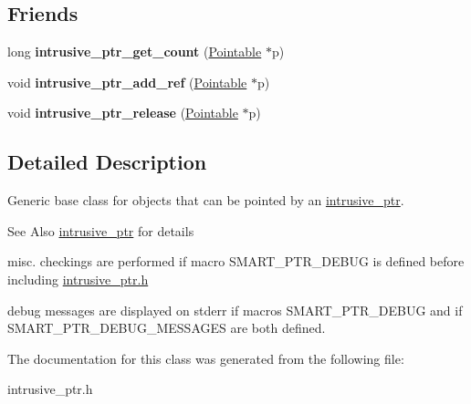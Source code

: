 \subsection*{Friends}
\begin{DoxyCompactItemize}
\item 
\hypertarget{classPointable_a9c08ce04af1d8cd2697b64990c51a5f4}{long {\bfseries intrusive\-\_\-ptr\-\_\-get\-\_\-count} (\hyperlink{classPointable}{Pointable} $\ast$p)}\label{classPointable_a9c08ce04af1d8cd2697b64990c51a5f4}

\item 
\hypertarget{classPointable_a16ec5f964af06a93d6c7cfe0979ff672}{void {\bfseries intrusive\-\_\-ptr\-\_\-add\-\_\-ref} (\hyperlink{classPointable}{Pointable} $\ast$p)}\label{classPointable_a16ec5f964af06a93d6c7cfe0979ff672}

\item 
\hypertarget{classPointable_aee25e5a73726af47eb078e2087eaee57}{void {\bfseries intrusive\-\_\-ptr\-\_\-release} (\hyperlink{classPointable}{Pointable} $\ast$p)}\label{classPointable_aee25e5a73726af47eb078e2087eaee57}

\end{DoxyCompactItemize}


\subsection{Detailed Description}
Generic base class for objects that can be pointed by an \hyperlink{classintrusive__ptr}{intrusive\-\_\-ptr}.
\begin{DoxyItemize}
\item \begin{DoxySeeAlso}{See Also}
\hyperlink{classintrusive__ptr}{intrusive\-\_\-ptr} for details
\end{DoxySeeAlso}

\item misc. checkings are performed if macro S\-M\-A\-R\-T\-\_\-\-P\-T\-R\-\_\-\-D\-E\-B\-U\-G is defined before including \hyperlink{intrusive__ptr_8h_source}{intrusive\-\_\-ptr.\-h}
\item debug messages are displayed on stderr if macros S\-M\-A\-R\-T\-\_\-\-P\-T\-R\-\_\-\-D\-E\-B\-U\-G and if S\-M\-A\-R\-T\-\_\-\-P\-T\-R\-\_\-\-D\-E\-B\-U\-G\-\_\-\-M\-E\-S\-S\-A\-G\-E\-S are both defined. 
\end{DoxyItemize}

The documentation for this class was generated from the following file\-:\begin{DoxyCompactItemize}
\item 
intrusive\-\_\-ptr.\-h\end{DoxyCompactItemize}
